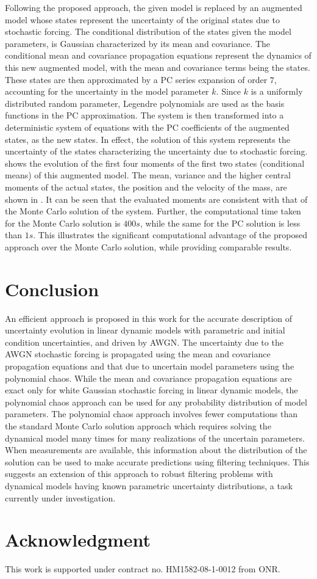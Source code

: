 \documentclass[10pt, conference]{IEEEtran}
\begin{document}
Following the proposed approach, the given model is replaced by an augmented model whose states represent the uncertainty of the original states due to stochastic forcing. The conditional distribution of the states given the model parameters, is Gaussian characterized by its mean and covariance. The conditional mean and covariance propagation equations represent the dynamics of this new augmented model, with the mean and covariance terms being the states. These states are then approximated by a PC series expansion of order $7$, accounting for the uncertainty in the model parameter $k$. Since $k$ is a uniformly distributed random parameter, Legendre polynomials are used as the basis functions in the PC approximation. The system is then transformed into a deterministic system of equations with the PC coefficients of the augmented states, as the new states. In effect, the solution of this system represents the uncertainty of the states characterizing the uncertainty due to stochastic forcing.  shows the evolution of the first four moments of the first two states (conditional means) of this augmented model. The mean, variance and the higher central moments of the actual states, the position and the velocity of the mass, are shown in . It can be seen that the evaluated moments are consistent with that of the Monte Carlo solution of the system. Further, the computational time taken for the Monte Carlo solution is $400s$, while the same for the PC solution is less than $1s$. This illustrates the significant computational advantage of the proposed approach over the Monte Carlo solution, while providing comparable results. 

\section{Conclusion}
An efficient approach is proposed in this work for the accurate description of uncertainty evolution in linear dynamic models with parametric and initial condition uncertainties, and driven by AWGN. The uncertainty due to the AWGN stochastic forcing is propagated using the mean and covariance propagation equations and that due to uncertain model parameters using the polynomial chaos. While the mean and covariance propagation equations are exact only for white Gaussian stochastic forcing in linear dynamic models, the polynomial chaos approach can be used for any probability distribution of model parameters. The polynomial chaos approach involves fewer computations than the standard Monte Carlo solution approach which requires solving the dynamical model many times for many realizations of the uncertain parameters. When measurements are available, this information about the distribution of the solution can be used to make accurate predictions using filtering techniques. This suggests an extension of this approach to robust filtering problems with dynamical models having known parametric uncertainty distributions, a task currently under investigation.

\section*{Acknowledgment}
This work is supported under contract no. HM1582-08-1-0012 from ONR.

%


\end{document}
